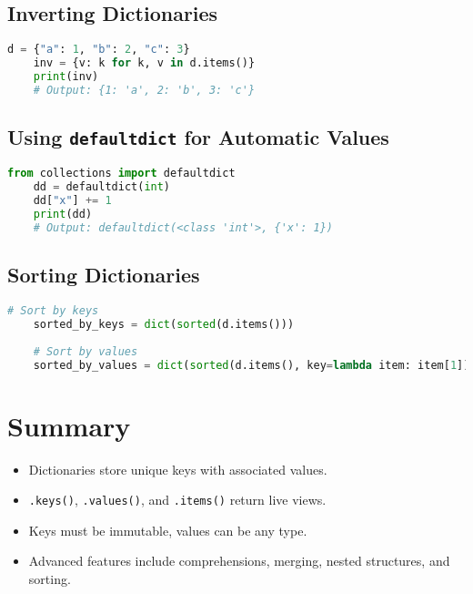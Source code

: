 \subsection{Inverting Dictionaries}
\begin{lstlisting}[language=Python]
	d = {"a": 1, "b": 2, "c": 3}
	inv = {v: k for k, v in d.items()}
	print(inv)
	# Output: {1: 'a', 2: 'b', 3: 'c'}
\end{lstlisting}

\subsection{Using \texttt{defaultdict} for Automatic Values}
\begin{lstlisting}[language=Python]
	from collections import defaultdict
	dd = defaultdict(int)
	dd["x"] += 1
	print(dd)  
	# Output: defaultdict(<class 'int'>, {'x': 1})
\end{lstlisting}

\subsection{Sorting Dictionaries}
\begin{lstlisting}[language=Python]
	# Sort by keys
	sorted_by_keys = dict(sorted(d.items()))
	
	# Sort by values
	sorted_by_values = dict(sorted(d.items(), key=lambda item: item[1]))
\end{lstlisting}

\section{Summary}
\begin{itemize}
	\item Dictionaries store unique keys with associated values.
	\item \texttt{.keys()}, \texttt{.values()}, and \texttt{.items()} return live views.
	\item Keys must be immutable, values can be any type.
	\item Advanced features include comprehensions, merging, nested structures, and sorting.
\end{itemize}